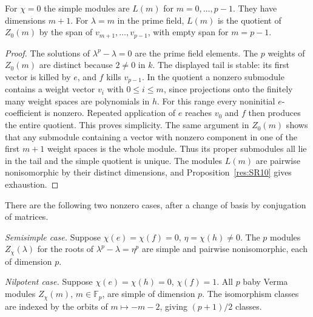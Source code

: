 \begin{theorem}
\label{res:SR11}
For \(\chi=0\) the simple modules are \(L(m)\) for
\(m=0,\ldots,p-1\). They have dimensions \(m+1\).
For \(\lambda=m\) in the prime field, \(L(m)\) is the
quotient of \(Z_0(m)\) by the span of
\(v_{m+1},\ldots,v_{p-1}\), with empty span for \(m=p-1\).
\end{theorem}

\begin{proof}
The solutions of \(\lambda^p-\lambda=0\) are the prime
field elements. The \(p\) weights of \(Z_0(m)\) are
distinct because \(2\ne0\) in \(k\). The displayed tail
is stable: its first vector is killed by \(e\), and \(f\)
kills \(v_{p-1}\). In the quotient a nonzero submodule
contains a weight vector \(v_i\) with \(0\le i\le m\),
since projections onto the finitely many weight spaces
are polynomials in \(h\). For this range every noninitial
\(e\)-coefficient is nonzero. Repeated application of \(e\)
reaches \(v_0\) and \(f\) then produces the entire quotient.
This proves simplicity. The same argument in \(Z_0(m)\)
shows that any submodule containing a vector with nonzero
component in one of the first \(m+1\) weight spaces is
the whole module. Thus its proper submodules all lie in
the tail and the simple quotient is unique.
The modules \(L(m)\) are pairwise nonisomorphic by their
distinct dimensions, and Proposition~\ref{res:SR10}
gives exhaustion.
\end{proof}

\begin{theorem}
\label{res:SR12}
There are the following two nonzero cases, after a change
of basis by conjugation of matrices.

\emph{Semisimple case.} Suppose
\(\chi(e)=\chi(f)=0\), \(\eta=\chi(h)\ne0\).
The \(p\) modules \(Z_\chi(\lambda)\) for the roots of
\(\lambda^p-\lambda=\eta^p\) are simple and pairwise
nonisomorphic, each of dimension \(p\).

\emph{Nilpotent case.} Suppose
\(\chi(e)=\chi(h)=0\), \(\chi(f)=1\).
All \(p\) baby Verma modules \(Z_\chi(m)\), \(m\in\mathbb F_p\),
are simple of dimension \(p\). The isomorphism classes
are indexed by the orbits of \(m\mapsto -m-2\), giving
\((p+1)/2\) classes.
\end{theorem}

